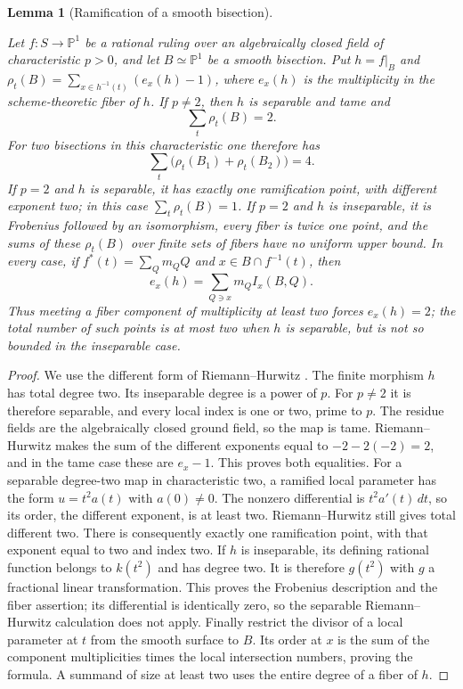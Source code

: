 \documentclass[11pt,reqno]{amsart}
\newtheorem{lemma}[lemma]{Lemma}
\theoremstyle{definition}
\theoremstyle{remark}
\newcommand{\PP}{\mathbb P}
\numberwithin{equation}{section}
\begin{document}
\begin{lemma}[Ramification of a smooth bisection]
\label{lem:bisection-ramification}

Let $f:S\to\PP^1$ be a rational ruling over an algebraically closed
field of characteristic $p>0$, and let $B\simeq\PP^1$ be a smooth
bisection. Put $h=f|_B$ and
$\rho_t(B)=\sum_{x\in h^{-1}(t)}(e_x(h)-1)$, where $e_x(h)$ is the
multiplicity in the scheme-theoretic fiber of $h$.
If $p\ne2$, then $h$ is separable and tame and
\begin{equation}\label{eq:one-bisection-ramification-budget}
 \sum_t\rho_t(B)=2.
\end{equation}
For two bisections in this characteristic one therefore has
\begin{equation}\label{eq:two-bisection-ramification-budget}
 \sum_t\bigl(\rho_t(B_1)+\rho_t(B_2)\bigr)=4.
\end{equation}
If $p=2$ and $h$ is separable, it has exactly one ramification point,
with different exponent two; in this case $\sum_t\rho_t(B)=1$.
If $p=2$ and $h$ is inseparable, it is Frobenius followed by an
isomorphism, every fiber is twice one point, and the sums of these
$\rho_t(B)$ over finite sets of fibers have no uniform upper bound.
In every case, if $f^*(t)=\sum_Qm_QQ$ and $x\in B\cap f^{-1}(t)$, then
\[
 e_x(h)=\sum_{Q\ni x}m_QI_x(B,Q).
\]
Thus meeting a fiber component of multiplicity at least two forces
$e_x(h)=2$; the total number of such points is at most two when $h$
is separable, but is not so bounded in the inseparable case.
\end{lemma}

\begin{proof}
We use the different form of Riemann--Hurwitz
\cite[Tag~0C1B]{Stacks}. The finite morphism $h$ has total
degree two. Its inseparable degree is
a power of $p$. For $p\ne2$ it is therefore separable, and every local
index is one or two, prime to $p$. The residue fields are the
algebraically closed ground field, so the map is tame. Riemann--Hurwitz
makes the sum of the different exponents equal to
$-2-2(-2)=2$, and in the tame case these are $e_x-1$.
This proves both equalities.
For a separable degree-two map in characteristic two, a ramified local
parameter has the form $u=t^2a(t)$ with $a(0)\ne0$. The nonzero
differential is $t^2a'(t)\,dt$, so its order, the different exponent,
is at least two. Riemann--Hurwitz still gives total different two.
There is consequently exactly one ramification point, with that
exponent equal to two and index two.
If $h$ is inseparable, its defining rational function belongs to
$k(t^2)$ and has degree two. It is therefore $g(t^2)$ with $g$ a
fractional linear transformation. This proves the Frobenius description
and the fiber assertion; its differential is identically zero, so the
separable Riemann--Hurwitz calculation does not apply.
Finally restrict the divisor of a local parameter at $t$ from the smooth
surface to $B$. Its order at $x$ is the sum of the component
multiplicities times the local intersection numbers, proving the formula.
A summand of size at least two uses the entire degree of a fiber of $h$.
\end{proof}
\end{document}
